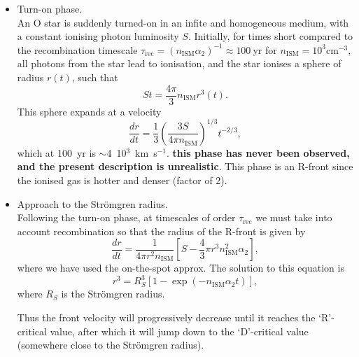 
\begin{itemize}

\item Turn-on phase.  \\

 An O star is suddenly turned-on in an infite and homogeneous medium,
 with a constant ionising photon luminosity $S$. Initially, for times
 short compared to the recombination timescale $\tau_\mathrm{rec} =
 (n_\mathrm{ISM} \alpha_2)^{-1} \approx 100~$yr for $n_\mathrm{ISM} =
 10^3$cm$^{-3}$, all photons from the star lead to ionisation, and the
 star ionises a sphere of radius $r(t)$, such that
\[ 
S t = \frac{4 \pi}{3} n_\mathrm{ISM} r^3(t).
\]
This sphere expands at a velocity 
\[
\frac{dr}{dt} = \frac{1}{3} \left( \frac{3 S}{4 \pi n_\mathrm{ISM}}  \right)^{1/3}  t^{-2/3},
\]
which at 100~yr is $\sim$4~10$^{3}$~km~s$^{-1}$.  {\bf this phase has
  never been observed, and the present description is
  unrealistic}. This phase is an R-front since the ionised gas is
hotter and denser (factor of 2). 

\end{itemize}




\begin{itemize}

\item Approach to the Str\"omgren radius.  \\ 

Following the turn-on phase, at timescales of order
$\tau_\mathrm{rec}$ we must take into account recombination so that
the radius of the R-front is given by
\[
\frac{dr}{dt}  = \frac{1}{4 \pi r^2 n_\mathrm{ISM} } \left[ S -
  \frac{4}{3} \pi r^3 n_\mathrm{ISM}^2 \alpha_2    \right],
\]
where we have used the on-the-spot approx.
The solution to this equation is 
\[ 
r^3 = R_S^3 [ 1 - \exp( - n_\mathrm{ISM} \alpha_2 t) ],
\]
where $R_S$ is the Str\"omgren radius. 

Thus the front velocity will progressively decrease until it reaches
the `R'-critical value, after which it will jump down to the
`D'-critical value (somewhere close to the Str\"omgren radius). 

\end{itemize}



